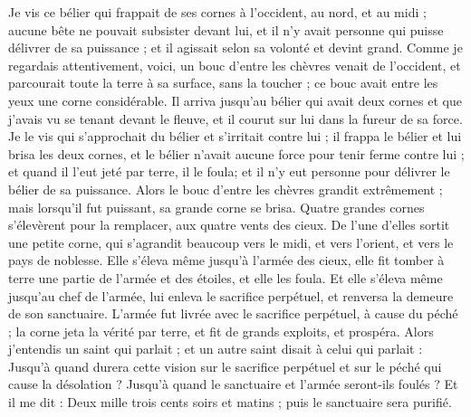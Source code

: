 \begin{multicols}{2}
Je vis ce bélier qui frappait de ses cornes à l'occident, au nord, et au midi ; aucune bête ne pouvait subsister devant lui, et il n'y avait personne qui puisse délivrer de sa puissance ; et il agissait selon sa volonté et devint grand.
Comme je regardais attentivement, voici, un bouc d'entre les chèvres venait de l'occident, et parcourait toute la terre à sa surface, sans la toucher ; ce bouc avait entre les yeux une corne considérable.
Il arriva jusqu'au bélier qui avait deux cornes et que j'avais vu se tenant devant le fleuve, et il courut sur lui dans la fureur de sa force.
Je le vis qui s'approchait du bélier et s'irritait contre lui ; il frappa le bélier et lui brisa les deux cornes, et le bélier n'avait aucune force pour tenir ferme contre lui ; et quand il l'eut jeté par terre, il le foula; et il n'y eut personne pour délivrer le bélier de sa puissance.
Alors le bouc d'entre les chèvres grandit extrêmement ; mais lorsqu'il fut puissant, sa grande corne se brisa. Quatre grandes cornes s'élevèrent pour la remplacer, aux quatre vents des cieux.
De l'une d'elles sortit une petite corne, qui s'agrandit beaucoup vers le midi, et vers l'orient, et vers le pays de noblesse.
Elle s'éleva même jusqu'à l'armée des cieux, elle fit tomber à terre une partie de l'armée et des étoiles, et elle les foula.
Et elle s'éleva même jusqu'au chef de l'armée, lui enleva le sacrifice perpétuel, et renversa la demeure de son sanctuaire.
L'armée fut livrée avec le sacrifice perpétuel, à cause du péché ; la corne jeta la vérité par terre, et fit de grands exploits, et prospéra.
Alors j'entendis un saint qui parlait ; et un autre saint disait à celui qui parlait : Jusqu'à quand durera cette vision sur le sacrifice perpétuel et sur le péché qui cause la désolation ? Jusqu'à quand le sanctuaire et l'armée seront-ils foulés ?
Et il me dit : Deux mille trois cents soirs et matins ; puis le sanctuaire sera purifié.

\end{multicols}
